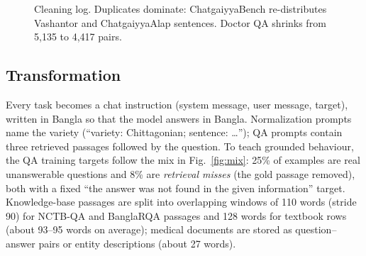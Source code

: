 \begin{figure}[!t]
\centering
{}
\caption{Cleaning log. Duplicates dominate: ChatgaiyyaBench re-distributes Vashantor and ChatgaiyyaAlap sentences. Doctor QA shrinks from 5,135 to 4,417 pairs.}
\label{fig:cleaning}
\end{figure}

\subsection{Transformation}
Every task becomes a chat instruction (system message, user message, target), written in Bangla so that the model answers in Bangla. Normalization prompts name the variety (``variety: Chittagonian; sentence: \ldots''); QA prompts contain three retrieved passages followed by the question. To teach grounded behaviour, the QA training targets follow the mix in Fig.~\ref{fig:mix}: 25\% of examples are real unanswerable questions and 8\% are \emph{retrieval misses} (the gold passage removed), both with a fixed ``the answer was not found in the given information'' target. Knowledge-base passages are split into overlapping windows of 110 words (stride 90) for NCTB-QA and BanglaRQA passages and 128 words for textbook rows (about 93--95 words on average); medical documents are stored as question--answer pairs or entity descriptions (about 27 words).


